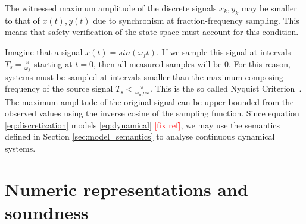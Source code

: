 \documentclass[sigconf]{llncs}
\renewcommand{\vec}[1]{{#1}}
\renewcommand{\note}[1]{\textcolor{red}{[#1]}}
\begin{document}
\begin{remark}
The witnessed maximum amplitude of the discrete signals $\vec{x}_k,\vec{y}_k$
may be smaller to that of $\vec{x}(t),\vec{y}(t)$ due to synchronism at
fraction-frequency sampling. This means that safety verification of the state space
must account for this condition.
\end{remark}
Imagine that a signal $\vec{x}(t)=sin\left({\omega_f t}\right)$. If we sample
this signal at intervals $T_s=\frac{\pi}{\omega_f}$ starting at $t=0$, then all
measured samples will be $0$.  For this reason, systems must be sampled at
intervals smaller than the maximum composing frequency of the source signal
$T_s<\frac{\pi}{\omega_max}$.  This is the so called Nyquist Criterion~\cite{Astrom08}.  
The maximum amplitude of the original signal can be upper bounded from the
observed values using the inverse cosine of the sampling function.
Since equation \eqref{eq:discretization} models \eqref{eq:dynamical} \note{fix ref}, we may use the semantics defined in Section
\ref{sec:model_semantics} to analyse continuous dynamical systems.

\section{Numeric representations and soundness} \label{sec:numeric_rep}
\end{document}
